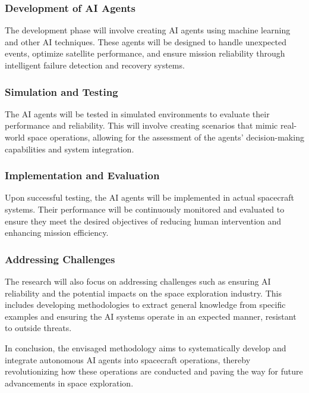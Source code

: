 \documentclass[a4paper,12pt]{article}
\begin{document}
\subsubsection{Development of AI Agents}

The development phase will involve creating AI agents using machine learning and other AI techniques. These agents will be designed to handle unexpected events, optimize satellite performance, and ensure mission reliability through intelligent failure detection and recovery systems.

\subsubsection{Simulation and Testing}

The AI agents will be tested in simulated environments to evaluate their performance and reliability. This will involve creating scenarios that mimic real-world space operations, allowing for the assessment of the agents' decision-making capabilities and system integration.

\subsubsection{Implementation and Evaluation}

Upon successful testing, the AI agents will be implemented in actual spacecraft systems. Their performance will be continuously monitored and evaluated to ensure they meet the desired objectives of reducing human intervention and enhancing mission efficiency.

\subsubsection{Addressing Challenges}

The research will also focus on addressing challenges such as ensuring AI reliability and the potential impacts on the space exploration industry. This includes developing methodologies to extract general knowledge from specific examples and ensuring the AI systems operate in an expected manner, resistant to outside threats.

In conclusion, the envisaged methodology aims to systematically develop and integrate autonomous AI agents into spacecraft operations, thereby revolutionizing how these operations are conducted and paving the way for future advancements in space exploration.
\end{document}
